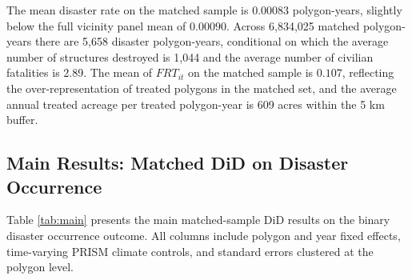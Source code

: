 \documentclass[12pt, letterpaper]{article}
\begin{document}
The mean disaster rate on the matched sample is $0.00083$ polygon-years, slightly below the full vicinity panel mean of $0.00090$. Across 6{,}834{,}025 matched polygon-years there are 5{,}658 disaster polygon-years, conditional on which the average number of structures destroyed is 1{,}044 and the average number of civilian fatalities is 2.89. The mean of $FRT_{it}$ on the matched sample is $0.107$, reflecting the over-representation of treated polygons in the matched set, and the average annual treated acreage per treated polygon-year is 609 acres within the 5 km buffer.

\subsection{Main Results: Matched DiD on Disaster Occurrence}

Table \ref{tab:main} presents the main matched-sample DiD results on the binary disaster occurrence outcome. All columns include polygon and year fixed effects, time-varying PRISM climate controls, and standard errors clustered at the polygon level.
\end{document}
